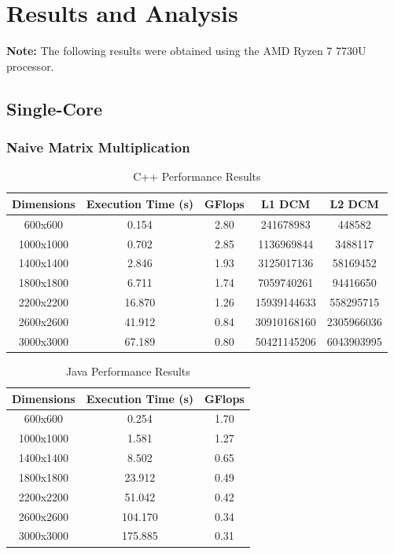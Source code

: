 \documentclass{article}
\begin{document}
\section{Results and Analysis}

\textbf{Note:} The following results were obtained using the AMD Ryzen 7 7730U processor.

\subsection{Single-Core}

\subsubsection{Naive Matrix Multiplication}

\begin{table}[H]
\centering
\caption{C++ Performance Results}
\begin{tabular}{||c | c | c | c | c||} 
 \hline
 \textbf{Dimensions} & \textbf{Execution Time (s)} & \textbf{GFlops} & \textbf{L1 DCM} & \textbf{L2 DCM} \\  
 \hline \hline
 600x600  & 0.154   & 2.80   & 241678983   & 448582    \\  
 \hline
 1000x1000 & 0.702   & 2.85   & 1136969844 & 3488117  \\  
 \hline
 1400x1400 & 2.846   & 1.93   & 3125017136 & 58169452 \\  
 \hline
 1800x1800 & 6.711   & 1.74   & 7059740261 & 94416650 \\  
 \hline
 2200x2200 & 16.870  & 1.26   & 15939144633 & 558295715 \\  
 \hline
 2600x2600 & 41.912  & 0.84   & 30910168160 & 2305966036 \\  
 \hline
 3000x3000 & 67.189  & 0.80   & 50421145206 & 6043903995 \\  
 \hline
\end{tabular}
\end{table}

\begin{table}[H]
\centering
\caption{Java Performance Results}
\begin{tabular}{||c | c | c||} 
 \hline
 \textbf{Dimensions} & \textbf{Execution Time (s)} & \textbf{GFlops} \\  
 \hline \hline
 600x600  & 0.254   & 1.70   \\  
 \hline
 1000x1000 & 1.581   & 1.27   \\  
 \hline
 1400x1400 & 8.502   & 0.65   \\  
 \hline
 1800x1800 & 23.912  & 0.49   \\  
 \hline
 2200x2200 & 51.042  & 0.42   \\  
 \hline
 2600x2600 & 104.170 & 0.34   \\  
 \hline
 3000x3000 & 175.885 & 0.31   \\  
 \hline
\end{tabular}
\end{table}
\end{document}
